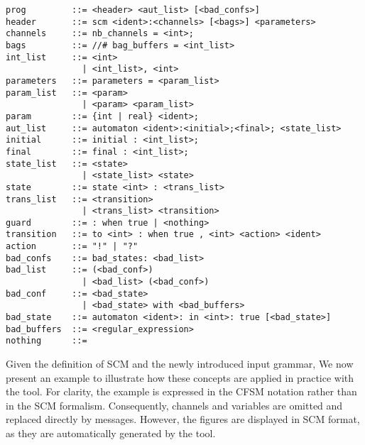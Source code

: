 \begin{lstlisting}[language={},caption={Modified SCM grammar},
    keywordstyle=\color{blue}\bfseries,label={lst:scm-grammar}] 
prog         ::= <header> <aut_list> [<bad_confs>]
header       ::= scm <ident>:<channels> [<bags>] <parameters>
channels     ::= nb_channels = <int>;
bags         ::= //# bag_buffers = <int_list>
int_list     ::= <int>
               | <int_list>, <int>
parameters   ::= parameters = <param_list>
param_list   ::= <param>
               | <param> <param_list>
param        ::= {int | real} <ident>;
aut_list     ::= automaton <ident>:<initial>;<final>; <state_list>
initial      ::= initial : <int_list>;
final        ::= final : <int_list>;
state_list   ::= <state>
               | <state_list> <state>
state        ::= state <int> : <trans_list>
trans_list   ::= <transition>
               | <trans_list> <transition>
guard        ::= : when true | <nothing>
transition   ::= to <int> : when true , <int> <action> <ident>
action       ::= "!" | "?"
bad_confs    ::= bad_states: <bad_list>
bad_list     ::= (<bad_conf>)
               | <bad_list> (<bad_conf>)
bad_conf     ::= <bad_state>
               | <bad_state> with <bad_buffers>
bad_state    ::= automaton <ident>: in <int>: true [<bad_state>]
bad_buffers  ::= <regular_expression>
nothing      ::= 
\end{lstlisting}

Given the definition of SCM and the newly introduced input grammar, 
We now present an example to illustrate how these concepts are applied 
in practice with the tool. For clarity, the example is expressed in the 
CFSM notation rather than in the SCM formalism. Consequently, channels 
and variables are omitted and replaced directly by messages. However, 
the figures are displayed in SCM format, as they are automatically 
generated by the tool.

\bigskip

